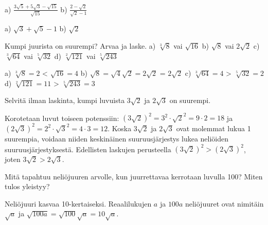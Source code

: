 \begin{tehtavasivu}
\begin{tehtava} 
a) $ \frac{3\sqrt{5}+5\sqrt{3}-\sqrt{15}}{\sqrt{15}}$  \quad b)  $ \frac{2-\sqrt{2}}{\sqrt{2}-1}$   \quad
\begin{vastaus}
a) $\sqrt{3}+\sqrt{5}-1$ \quad b) $\sqrt{2}$ \quad
\end{vastaus}
\end{tehtava}

\begin{tehtava} Kumpi juurista on suurempi? Arvaa ja laske.
a) $\sqrt[3]{8}$ vai $\sqrt{16}$ \quad b)  $\sqrt{8}$ vai $2\sqrt{2}$  \quad c) $\sqrt[3]{64}$ vai $\sqrt[5]{32}$ \quad d) $\sqrt[2]{121}$ vai $\sqrt[5]{243}$ 
\begin{vastaus}
a) $\sqrt[3]{8}=2$   <   $\sqrt{16}=4$ \quad b) $\sqrt{8}=\sqrt{4}\sqrt{2}=2\sqrt{2}$ \quad = \quad $2\sqrt{2}$ \quad c) $\sqrt[3]{64}=4$   >   $\sqrt[5]{32}=2$ \quad d) $\sqrt[2]{121}=11$ \quad  > \quad $\sqrt[5]{243}=3$ 
\end{vastaus}
\end{tehtava}


\begin{tehtava}
        Selvitä ilman laskinta, kumpi luvuista $3\sqrt{2}$ ja $2\sqrt{3}$ on suurempi. 
       
        \begin{vastaus}
        Korotetaan luvut toiseen potenssiin: $(3\sqrt{2})^2=3^2\cdot\sqrt{2}^2=9 \cdot 2=18$ ja $(2\sqrt{3})^2=2^2\cdot\sqrt{3}^2=4 \cdot 3=12$. Koska $3\sqrt{2}$ ja $2\sqrt{3}$ ovat molemmat lukua 1 suurempia, voidaan niiden keskinäinen suuruusjärjestys lukea neliöiden suuruusjärjestyksestä. Edellisten laskujen perusteella $(3\sqrt{2})^2 > (2\sqrt{3})^2$, joten $3\sqrt{2} > 2\sqrt{3}$.
        \end{vastaus}
\end{tehtava}

\begin{tehtava}
        Mitä tapahtuu neliöjuuren arvolle, kun juurrettavaa kerrotaan luvulla 100? Miten tulos yleistyy?
       
        \begin{vastaus}
        Neliöjuuri kasvaa 10-kertaiseksi. Reaalilukujen $a$ ja $100a$ neliöjuuret ovat nimitäin $\sqrt{a}$ ja $\sqrt{100a}=\sqrt{100}\sqrt{a}=10\sqrt{a}$.
        

\end{vastaus}
\end{tehtava}
\end{tehtavasivu}
